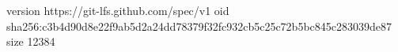 version https://git-lfs.github.com/spec/v1
oid sha256:c3b4d90d8e22f9ab5d2a24dd78379f32fc932cb5c25c72b5bc845c283039de87
size 12384
